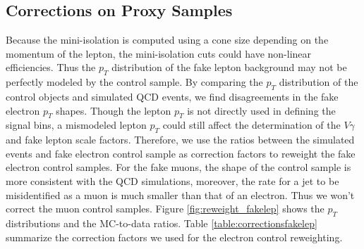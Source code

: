 \documentclass[thesis.tex]{subfiles}
\renewcommand\_{\textunderscore\allowbreak}
\begin{document}
\subsection{Corrections on Proxy Samples}
Because the mini-isolation is computed using a cone size depending on the momentum of the lepton, the mini-isolation cuts could have non-linear efficiencies. Thus the $p_T$ distribution of the fake lepton background may not be perfectly modeled by the control sample. By comparing the $p_T$ distribution of the control objects and simulated QCD events, we find disagreements in the fake electron $p_T$ shapes. Though the lepton $p_T$ is not directly used in defining the signal bins, a mismodeled lepton $p_T$ could still affect the determination of the $V\gamma$ and fake lepton scale factors. Therefore, we use the ratios between the simulated events and fake electron control sample as correction factors to reweight the fake electron control samples. For the fake muons, the shape of the control sample is more consistent with the QCD simulations, moreover, the rate for a jet to be misidentified as a muon is much smaller than that of an electron. Thus we won't correct the muon control samples. 
Figure \ref{fig:reweight_fakelep} shows the $p_T$ distributions and the MC-to-data ratios. Table \ref{table:correctionsfakelep} summarize the correction factors we used for the electron control reweighting.
\end{document}
